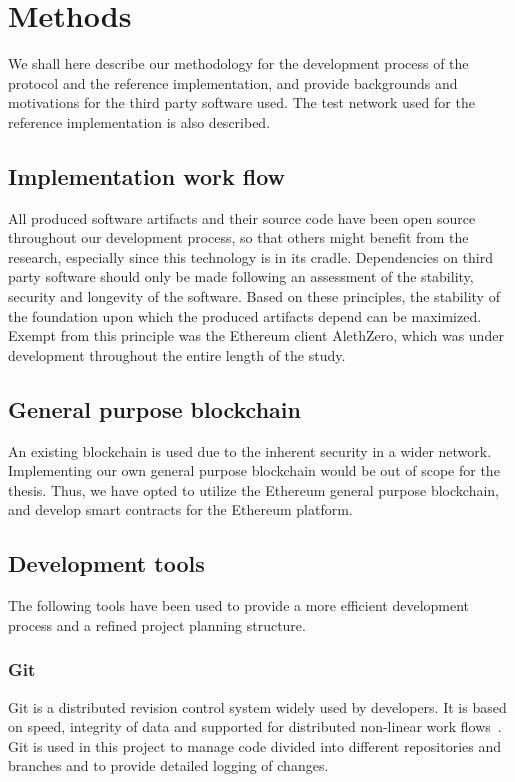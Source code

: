 \chapter{Methods}
We shall here describe our methodology for the development process of the protocol and the reference implementation, and provide backgrounds and motivations for the third party software used. The test network used for the reference implementation is also described.

\section{Implementation work flow}
All produced software artifacts and their source code have been open source throughout our development process, so that others might benefit from the research, especially since this technology is in its cradle. Dependencies on third party software should only be made following an assessment of the stability, security and longevity of the software. Based on these principles, the stability of the foundation upon which the produced artifacts depend can be maximized. Exempt from this principle was the Ethereum client AlethZero, which was under development throughout the entire length of the study. 

\section{General purpose blockchain}
An existing blockchain is used due to the inherent security in a wider network. Implementing our own general purpose blockchain would be out of scope for the thesis. Thus, we have opted to utilize the Ethereum general purpose blockchain, and develop smart contracts for the Ethereum platform.

\section{Development tools}
The following tools have been used to provide a more efficient development process and a refined project planning structure.

\subsection{Git}
Git is a distributed revision control system widely used by developers. It is based on speed, integrity of data and supported for distributed non-linear work flows~\cite{git}. Git is used in this project to manage code divided into different repositories and branches and to provide detailed logging of changes. 


